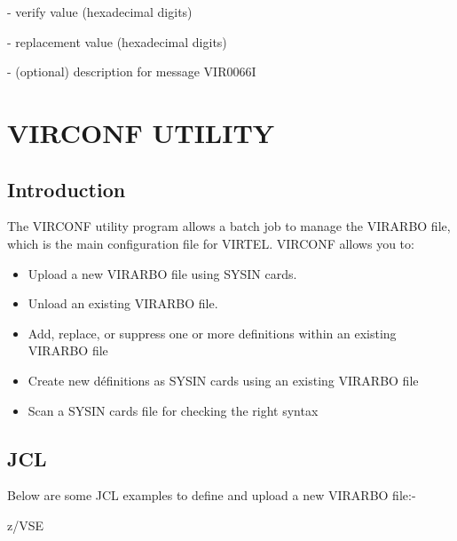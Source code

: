 \documentclass[letterpaper,10pt,english]{sphinxmanual}
\begin{document}
 - verify value (hexadecimal digits)

 - replacement value (hexadecimal digits)

 - (optional) description for message VIR0066I


\chapter{VIRCONF UTILITY}
\label{\detokenize{Installation_Guide:index-17}}\label{\detokenize{Installation_Guide:virconf-utility}}

\section{Introduction}
\label{\detokenize{Installation_Guide:id7}}
The VIRCONF utility program allows a batch job to manage the VIRARBO file, which is the main configuration file for VIRTEL. VIRCONF allows you to:
\begin{itemize}
\item {} 
Upload a new VIRARBO file using SYSIN cards.

\item {} 
Unload an existing VIRARBO file.

\item {} 
Add, replace, or suppress one or more definitions within an existing VIRARBO file

\item {} 
Create new définitions as SYSIN cards using an existing VIRARBO file

\item {} 
Scan a SYSIN cards file for checking the right syntax

\end{itemize}


\section{JCL}
\label{\detokenize{Installation_Guide:jcl}}\label{\detokenize{Installation_Guide:index-18}}
Below are some JCL examples to define and upload a new VIRARBO file:-

z/VSE
\end{document}
